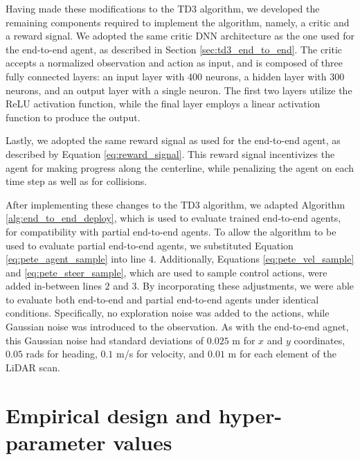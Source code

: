 Having made these modifications to the TD3 algorithm, we developed the remaining components required to implement the algorithm, namely, a critic and a reward signal.
We adopted the same critic DNN architecture as the one used for the end-to-end agent, as described in Section \ref{sec:td3_end_to_end}. 
The critic accepts a normalized observation and action as input, and is composed of three fully connected layers: an input layer with 400 neurons, a hidden layer with 300 neurons, and an output layer with a single neuron. The first two layers utilize the ReLU activation function, while the final layer employs a linear activation function to produce the output. 

Lastly, we adopted the same reward signal as used for the end-to-end agent, as described by Equation \ref{eq:reward_signal}. 
This reward signal incentivizes the agent for making progress along the centerline, while penalizing the agent on each time step as well as for collisions.


After implementing these changes to the TD3 algorithm, we adapted Algorithm \ref{alg:end_to_end_deploy}, which is used to evaluate trained end-to-end agents, for compatibility with partial end-to-end agents.
To allow the algorithm to be used to evaluate partial end-to-end agents, we substituted Equation \ref{eq:pete_agent_sample} into line $4$.
Additionally, Equations \ref{eq:pete_vel_sample} and \ref{eq:pete_steer_sample}, which are used to sample control actions, were added in-between lines $2$ and $3$.
By incorporating these adjustments, we were able to evaluate both end-to-end and partial end-to-end agents under identical conditions. 
Specifically, no exploration noise was added to the actions, while Gaussian noise was introduced to the observation.
As with the end-to-end agnet, this Gaussian noise had standard deviations of $0.025$ m for $x$ and $y$ coordinates, $0.05$ rads for heading, $0.1$ m/s for velocity, and $0.01$ m for each element of the LiDAR scan. 













\section{Empirical design and hyper-parameter values}

